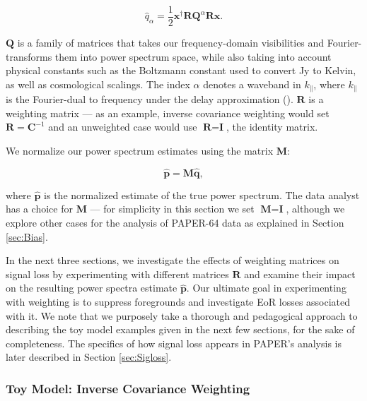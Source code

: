 \documentclass[preprint2,numberedappendix,tighten]{aastex6}  %
\begin{document}
\begin{equation}
\label{eq:qhat}
\hat{q}_{\alpha} = \frac{1}{2}\textbf{x}^{\dagger}\textbf{R}\textbf{Q}^{\alpha}\textbf{R}\textbf{x}.
\end{equation}

\noindent $\textbf{Q}$ is a family of matrices that takes our frequency-domain visibilities and Fourier-transforms them into 
power spectrum space, while also taking into account physical constants such as the Boltzmann constant used to convert Jy to 
Kelvin, as well as cosmological scalings. The index $\alpha$ denotes a waveband in $k_{\parallel}$, where $k_{\parallel}$ is the 
Fourier-dual to frequency under the delay approximation (\citealt{parsons_et_al2012b}). $\textbf{R}$ is a weighting matrix --- as 
an example, inverse covariance weighting would set $\textbf{R} = \textbf{C}^{-1}$ and an unweighted case would use $
\textbf{R} = \textbf{I}$, the identity matrix.

We normalize our power spectrum estimates using the matrix $\textbf{M}$:

\begin{equation}
\label{eq:phat}
\hat{\textbf{p}} = \textbf{M}\hat{\textbf{q}},
\end{equation}

\noindent where $\hat{\textbf{p}}$ is the normalized estimate of the true power spectrum. The data analyst has a choice for $
\textbf{M}$ --- for simplicity in this section we set $\textbf{M} = \textbf{I}$, although we explore other cases for the analysis 
of PAPER-64 data as explained in Section \ref{sec:Bias}.

In the next three sections, we investigate the effects of weighting matrices on signal loss by experimenting with different 
matrices $\textbf{R}$ and examine their impact on the resulting power spectra estimate $\hat{\textbf{p}}$. Our ultimate goal in 
experimenting with weighting is to suppress foregrounds and investigate EoR losses associated with it. We note that we 
purposely take a thorough and pedagogical approach to describing the toy model examples given in the next few sections, for 
the sake of completeness. The specifics of how signal loss appears in PAPER's analysis is later described in Section 
\ref{sec:Sigloss}.

\subsubsection{Toy Model: Inverse Covariance Weighting}
\label{sec:toymodel}
\end{document}
